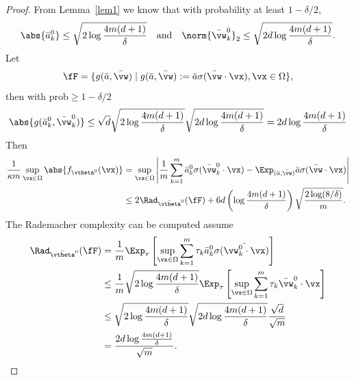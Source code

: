 \documentclass{article}
\begin{document}
\begin{proof}
    From Lemma~\ref{lem1} we know that with probability at least $1-\delta/2$,
    \begin{equation}
        \abs{\bar{a}_k^0} \leq \sqrt{2\log\frac{4m(d+1)}{\delta}} \quad \text{and} \quad \norm{\bar{\vw}_k^0}_2 \leq \sqrt{2d\log\frac{4m(d+1)}{\delta}}.
    \end{equation}
    Let
    \begin{equation}
        \fF = \{g(\bar{a},\bar{\vw}) \mid g(\bar{a},\bar{\vw}):=\bar{a}\sigma(\bar{\vw}\cdot\vx),\vx\in\Omega \},
    \end{equation}
    then with prob$\geq 1-\delta/2$
    \begin{equation}
        \abs{g(\bar{a}^0_k,\bar{\vw}^0_k)}\leq\sqrt{d}\sqrt{2\log\frac{4m(d+1)}{\delta}}\sqrt{2d\log\frac{4m(d+1)}{\delta}}=2d\log\frac{4m(d+1)}{\delta}
    \end{equation}
    Then
    \begin{equation}
        \begin{aligned}
            \frac{1}{\kappa m}\sup_{\vx\in\Omega}\abs{f_{\vtheta^0}(\vx)}
             & =\sup_{\vx\in\Omega}\left\lvert \frac{1}{m}\sum_{k=1}^m \bar{a}_k^0\sigma(\bar{\vw}_k^0\cdot\vx)-\Exp_{(\bar{a},\bar{\vw})}\bar{a}\sigma(\bar{\vw}\cdot\vx)\right\rvert \\
             & \leq 2\Rad_{\bar{\vtheta}^0}(\fF) + 6d \left(\log\frac{4m(d+1)}{\delta}\right)\sqrt{\frac{2\log(8/\delta)}{m}}.
        \end{aligned}
    \end{equation}
    The Rademacher complexity can be computed assume
    \begin{equation}
        \begin{aligned}
            \Rad_{\bar{\vtheta}^0}(\fF)
             & =\frac{1}{m}\Exp_{\tau}\left[\sup_{\vx\in\Omega}\sum_{k=1}^m\tau_k\bar{a}^0_k\sigma(\bar{\vw^0_k\cdot\vx})\right]                   \\
             & \leq\frac{1}{m}\sqrt{2\log\frac{4m(d+1)}{\delta}}\Exp_{\tau}\left[\sup_{\vx\in\Omega}\sum_{k=1}^m\tau_k\bar{\vw}^0_k\cdot\vx\right] \\
             & \leq\sqrt{2\log\frac{4m(d+1)}{\delta}}\sqrt{2d\log\frac{4m(d+1)}{\delta}}\frac{\sqrt{d}}{\sqrt{m}}                                  \\
             & =\frac{2d\log\frac{4m(d+1)}{\delta}}{\sqrt{m}}.
        \end{aligned}
    \end{equation}

\end{proof}
\end{document}
